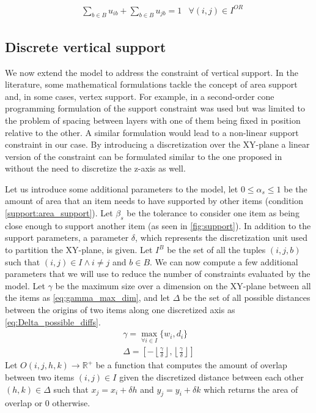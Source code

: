 \begin{align}
    & \sum\limits_{b \in B} u_{ib} + \sum\limits_{b \in B} u_{jb} = 1 & \forall (i, j) \in I^{OR} \label{cons:all_items_in_bin_with_rotation}
\end{align}

\subsection*{Discrete vertical support}
\label{subsec:vertical_support_formulation}%

We now extend the model to address the constraint of vertical support.
In the literature, some mathematical formulations tackle the concept of area support and, in some cases, vertex support. For example, in \cite{GZARA20201062} a second-order cone programming formulation of the support constraint was used but was limited to the problem of spacing between layers with one of them being fixed in position relative to the other. A similar formulation would lead to a non-linear support constraint in our case.
By introducing a discretization over the XY-plane a linear version of the constraint can be formulated similar to the one proposed in \cite{kurpel2020exact} without the need to discretize the z-axis as well.

Let us introduce some additional parameters to the model, let $0 \le \alpha_s \le 1$ be the amount of area that an item needs to have supported by other items (condition \ref{support:area_support}). Let $\beta_s$ be the tolerance to consider one item as being close enough to support another item (as seen in \cref{fig:support}).
In addition to the support parameters, a parameter $\delta$, which represents the discretization unit used to partition the XY-plane, is given. Let $I^B$ be the set of all the tuples $(i, j, b)$ such that $(i,j) \in I \land i \neq j$ and $b \in B$.
We can now compute a few additional parameters that we will use to reduce the number of constraints evaluated by the model. Let $\gamma$ be the maximum size over a dimension on the XY-plane between all the items as \cref{eq:gamma_max_dim}, and let $\Delta$ be the set of all possible distances between the origins of two items along one discretized axis as \cref{eq:Delta_possible_diffs}.
\begin{align}
    \gamma = \max_{\forall i \in I}\{ w_i, d_i \} \label{eq:gamma_max_dim} \\
    \Delta =  \left[ - \left\lfloor \frac{ \gamma }{\delta} \right\rfloor, \left\lfloor \frac{ \gamma }{\delta} \right\rfloor \right] \label{eq:Delta_possible_diffs}
\end{align}
Let $O(i, j, h, k) \rightarrow \mathbb{R}^+$ be a function that computes the amount of overlap between two items $(i,j) \in I$ given the discretized distance between each other $(h, k) \in \Delta$ such that $x_j = x_i + \delta h$ and $y_j = y_i + \delta k$ which returns the area of overlap or 0 otherwise.

